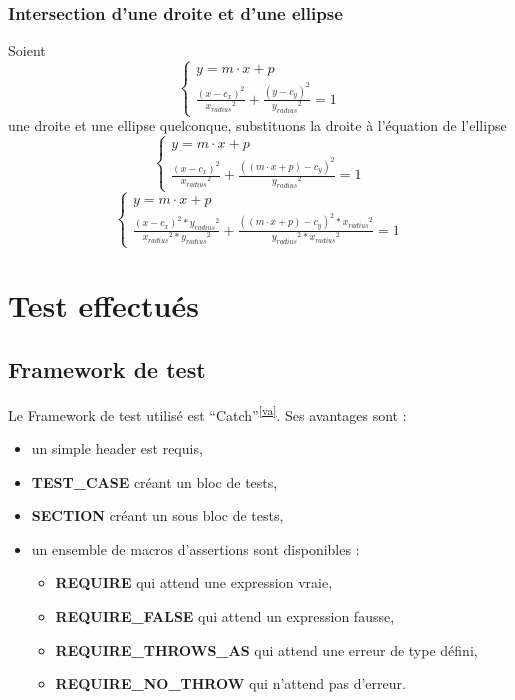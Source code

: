 \documentclass[a4paper,11pt]{report}
\begin{document}
\subsection[Droite et ellipse]{Intersection d'une droite et d'une ellipse}
Soient \\
$$\begin{cases}
	y = m \cdot x + p \\
	\frac{(x - c_x)^2}{{x_{radius}}^2} + \frac{(y - c_y)^2}{{y_{radius}}^2} = 1
\end{cases}$$
une droite et une ellipse quelconque, substituons la droite à l'équation de
l'ellipse
$$\begin{cases}
	y = m \cdot x + p \\
	\frac{(x - c_x)^2}{{x_{radius}}^2} + \frac{((m \cdot x + p) - c_y)^2}{{y_{radius}}^2} = 1
\end{cases}$$
$$\begin{cases}
	y = m \cdot x + p \\
	\frac{(x - c_x)^2 * {y_{radius}}^2}{{x_{radius}}^2 * {y_{radius}}^2} +
	\frac{((m \cdot x + p) - c_y)^2 * {x_{radius}}^2}{{y_{radius}}^2 * {x_{radius}}^2} = 1
\end{cases}$$


\chapter{Test effectués}
\section{Framework de test}
Le Framework de test utilisé est
``Catch''\textsuperscript{\ref{va}}. Ses avantages
sont :
\begin{itemize}
	\item un simple header est requis,
	\item \textbf{TEST\_CASE} créant un bloc de tests,
	\item \textbf{SECTION} créant un sous bloc de tests,
	\item un ensemble de macros d'assertions sont disponibles :
		\begin{itemize}
			\item\textbf{REQUIRE} qui attend une expression vraie,
			\item\textbf{REQUIRE\_FALSE} qui attend un expression fausse,
			\item\textbf{REQUIRE\_THROWS\_AS} qui attend une erreur de type défini,
			\item\textbf{REQUIRE\_NO\_THROW} qui n'attend pas d'erreur.
		\end{itemize}
\end{itemize} 
\end{document}
